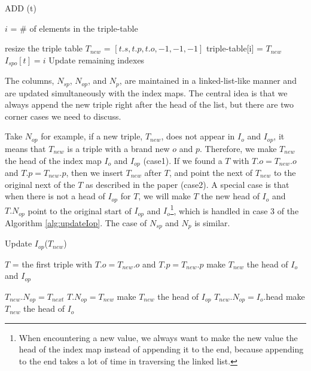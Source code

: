 \documentclass{article}
\begin{document}
\begin{enumerate}
\begin{enumerate}
\begin{algorithm}[H]
\caption{ADD (t)}\label{alg:cap}
\begin{algorithmic}

 
\State \Return
\EndIf

\State $i$ = \# of elements in the triple-table

\State resize the triple table
\EndIf
\State $T_{new}$ = $[t.s, t.p, t.o, -1, -1, -1]$ 
\State triple-table[i] = $T_{new}$
\State $I_{spo}[t] = i$
\State Update remaining indexes
\end{algorithmic}
\end{algorithm}

The columns, $N_{sp}$, $N_{op}$, and $N_p$, are maintained in a linked-list-like manner and are updated simultaneously with the index maps. The central idea is that we always append the new triple right after the head of the list, but there are two corner cases we need to discuss.


Take $N_{op}$ for example, if a new triple, $T_{new}$, does not appear in  $I_o$ and $I_{op}$, it means that  $T_{new}$ is a triple with a brand new $o$ and $p$. Therefore, we make $T_{new}$ the head of the index map $I_o$ and $I_{op}$ (case1). If we found a $T$ with $T.o = T_{new}.o$ and $T.p = T_{new}.p$, then we insert $T_{new}$ after $T$, and point the next of $T_{new}$ to the original next of the $T$ as described in the paper (case2). A special case is that when there is not a head of $I_{op}$ for $T$, we will make $T$ the new head of $I_{o}$ and $T.N_{op}$ point to the original start of $I_{op}$ and $I_o$\footnote{When encountering a new value, we always want to make the new value the head of the index map instead of appending it to the end, because appending to the end takes a lot of time in traversing the linked list.}, which is handled in case 3 of the Algorithm \eqref{alg:updateIop}. The case of $N_{sp}$ and $N_p$ is similar.

\begin{algorithm}[H]
\caption{Update $I_{op}$($T_{new}$)}\label{alg:updateIop}
\begin{algorithmic}
\State $T$ = the first triple with $T.o = T_{new}.o$ and $T.p = T_{new}.p$
\State make $T_{new}$ the head of $I_o$ and $I_{op}$ 
\EndIf

\State $T_{new}.N_{op} = T_{next}$
\State $T.N_{op} = T_{new}$
 
\State make $T_{new}$ the head of $I_{op}$ 
\State $T_{new}.N_{op} = I_o$.head
\State make $T_{new}$ the head of $I_{o}$ 
\EndIf


\end{algorithmic}
\end{algorithm}
\end{enumerate}
\end{enumerate}
\end{document}
